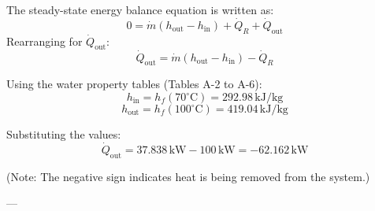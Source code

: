 The steady-state energy balance equation is written as:  
\[
0 = \dot{m} \left( h_{\text{out}} - h_{\text{in}} \right) + \dot{Q}_R + \dot{Q}_{\text{out}}
\]  
Rearranging for \( \dot{Q}_{\text{out}} \):  
\[
\dot{Q}_{\text{out}} = \dot{m} \left( h_{\text{out}} - h_{\text{in}} \right) - \dot{Q}_R
\]  

Using the water property tables (Tables A-2 to A-6):  
\[
h_{\text{in}} = h_f(70^\circ\text{C}) = 292.98 \, \text{kJ/kg}
\]  
\[
h_{\text{out}} = h_f(100^\circ\text{C}) = 419.04 \, \text{kJ/kg}
\]  

Substituting the values:  
\[
\dot{Q}_{\text{out}} = 37.838 \, \text{kW} - 100 \, \text{kW} = -62.162 \, \text{kW}
\]  

(Note: The negative sign indicates heat is being removed from the system.)  

---